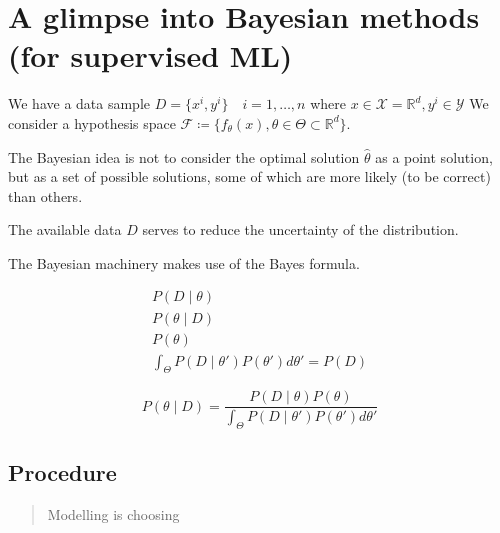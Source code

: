 \section[A glimpse into Bayesian methods]{A glimpse into Bayesian methods (for supervised ML)}

We have a data sample \(D = \{ x^i, y^i\}\quad i = 1, \dots, n\)
where \(x \in \mathcal{X} = \mathds{R}^d, y^i \in \mathcal{Y}\)
We consider a hypothesis space
\(\mathcal{F} \coloneqq \{ f_\theta (x), \theta \in \Theta \subset \mathds{R}^d \}\).

The Bayesian idea is not to consider the optimal solution
\(\hat{\theta}\) as a point solution, but as a set of possible solutions,
some of which are more likely (to be correct) than others.

The available data \(D\) serves to reduce the uncertainty of the
distribution.

The Bayesian machinery makes use of the Bayes formula.

\begin{align*}
	P(D \mid \theta) \tag{likelihood} \\
	P(\theta \mid D) \tag{posterior}  \\
	P(\theta) \tag{prior}          \\
	\int_\Theta P(D \mid \theta') P(\theta') d\theta' = P(D) \tag{EXPECTED \equiv EVIDENCE}
\end{align*}

\[
	P(\theta \mid D) = \frac{P(D \mid \theta) P(\theta)}
	{ \int_\Theta P(D \mid \theta') P(\theta') d\theta' }
\]

\subsection{Procedure}

\begin{quote}
	Modelling is choosing
\end{quote}

